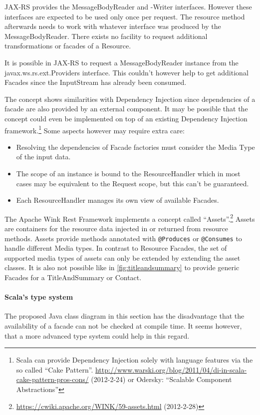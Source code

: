 \documentclass[12pt,a4paper,twoside]{scrartcl}		%
\newcommand{\citeurl}[2]{\url{#1} (#2)}
\begin{document}
JAX-RS provides the MessageBodyReader and -Writer interfaces. However these
interfaces are expected to be used only once per request. The resource method
afterwards needs to work with whatever interface was produced by the
MessageBodyReader. There exists no facility to request additional
transformations or facades of a Resource.

It is possible in JAX-RS to request a MessageBodyReader instance from the
javax.ws.rs.ext.Providers interface. This couldn't however help to get
additional Facades since the InputStream has already been consumed.

The concept shows similarities with Dependency Injection since dependencies of a
facade are also provided by an external component. It may be possible that the
concept could even be implemented on top of an existing Dependency Injection
framework.\footnote{Scala can provide Dependency Injection solely with language
  features via the so called ``Cake
  Pattern''. \citeurl{http://www.warski.org/blog/2011/04/di-in-scala-cake-pattern-pros-cons/}{2012-2-24}
  or Odersky: ``Scalable Component Abstractions''} Some aspects however may
require extra care:

\begin{itemize}
\item Resolving the dependencies of Facade factories must consider the Media
  Type of the input data.
\item The scope of an instance is bound to the ResourceHandler which in most
  cases may be equivalent to the Request scope, but this can't be guaranteed.
\item Each ResourceHandler manages its own view of available Facades.
\end{itemize}

The Apache Wink Rest Framework implements a concept called
``Assets''.\footnote{\citeurl{https://cwiki.apache.org/WINK/59-assets.html}{2012-2-28}}
Assets are containers for the resource data injected in or returned from
resource methods. Assets provide methods annotated with \lstinline:@Produces: or
\lstinline:@Consumes: to handle different Media types. In contrast to Resource
Facades, the set of supported media types of assets can only be extended by
extending the asset classes. It is also not possible like in
\autoref{fig:titleandsummary} to provide generic Facades for a TitleAndSummary
or Contact.

\paragraph{Scala's type system}
The proposed Java class diagram in this section has the disadvantage that the
availability of a facade can not be checked at compile time. It seems however,
that a more advanced type system could help in this regard.
\end{document}
